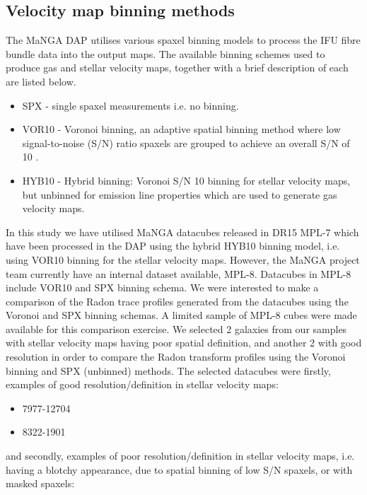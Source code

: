 \subsection{Velocity map binning methods}
\label{sec:binning-methods}
The MaNGA DAP utilises various spaxel binning models to process the IFU fibre bundle data into the output maps. The available binning schemes used to produce gas and stellar velocity maps, together with a brief description of each are listed below.

\begin{itemize}
    \item SPX - single spaxel measurements i.e. no binning.
    \item VOR10 - Voronoi binning, an adaptive spatial binning method where low signal-to-noise (S/N) ratio spaxels are grouped to achieve an overall S/N of 10  \citep{2003MNRAS.342..345C, 2019arXiv190100856W}.
    \item HYB10 - Hybrid binning: Voronoi S/N 10 binning for stellar velocity maps, but unbinned for emission line properties which are used to generate gas velocity maps.
\end{itemize}  

In this study we have utilised MaNGA datacubes released in DR15 MPL-7 which have been processed in the DAP using the hybrid HYB10 binning model, i.e. using VOR10 binning for the stellar velocity maps. However, the MaNGA project team currently have an internal dataset available, MPL-8. Datacubes in MPL-8 include VOR10 and SPX binning schema. We were interested to make a comparison of the Radon trace profiles generated from the datacubes using the Voronoi and SPX binning schemas. A limited sample of MPL-8 cubes were made available for this comparison exercise. We selected 2 galaxies from our samples with stellar velocity maps having poor spatial definition, and another 2 with good resolution in order to compare the Radon transform profiles using the Voronoi binning and SPX (unbinned) methods. The selected datacubes were firstly, examples of good resolution/definition in stellar velocity maps:

\begin{itemize}
    \item 7977-12704
    \item 8322-1901
\end{itemize}

and secondly, examples of poor resolution/definition in stellar velocity maps, i.e. having a blotchy appearance, due to spatial binning of low S/N spaxels, or with masked spaxels:

